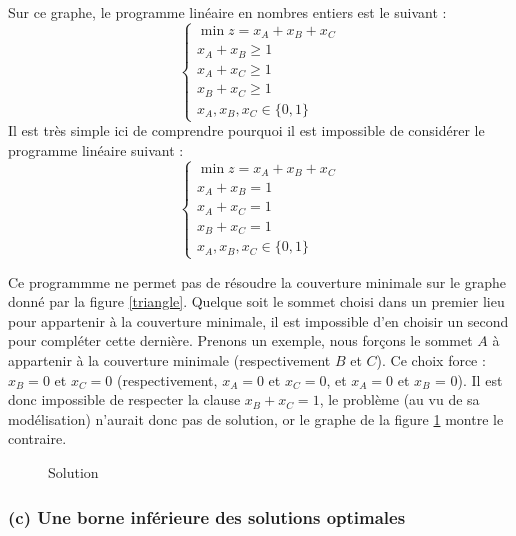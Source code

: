 Sur ce graphe, le programme linéaire en nombres entiers est le suivant :$$
\left \{ \begin{array}{l}
		\min z = x_A + x_B + x_C\\
		x_A + x_B \geq 1 \\
		x_A + x_C \geq 1 \\
		x_B + x_C \geq 1 \\
		x_A, x_B, x_C \in \{0, 1\}
	\end{array} \right .
	$$
Il est très simple ici de comprendre pourquoi il est impossible de considérer le programme linéaire
suivant :$$
\left \{ \begin{array}{l}
		\min z = x_A + x_B + x_C\\
		x_A + x_B = 1 \\
		x_A + x_C = 1 \\
		x_B + x_C = 1 \\
		x_A, x_B, x_C \in \{0, 1\}
	\end{array} \right .
	$$

Ce programmme ne permet pas de résoudre la couverture minimale sur le graphe donné par la figure
\ref{triangle}. Quelque soit le sommet choisi dans un premier lieu pour appartenir à la couverture
minimale, il est impossible d'en choisir un second pour compléter cette dernière. Prenons un
exemple, nous forçons le sommet $A$ à appartenir à la couverture minimale (respectivement $B$ et
$C$). Ce choix force : $x_B = 0$ et $x_C = 0$ (respectivement, $x_A = 0$ et $x_C = 0$, et $x_A = 0$
et $x_B$ = 0). Il est donc impossible de respecter la clause $x_B + x_C = 1$, le problème (au vu de
sa modélisation) n'aurait donc pas de solution, or le graphe de la figure \ref{trisol} montre le
contraire.

\begin{figure}
	\begin{center}
	\end{center}
	\label{trisol}
	\caption{Solution}
\end{figure}

\subsubsection{(c) Une borne inférieure des solutions optimales}

